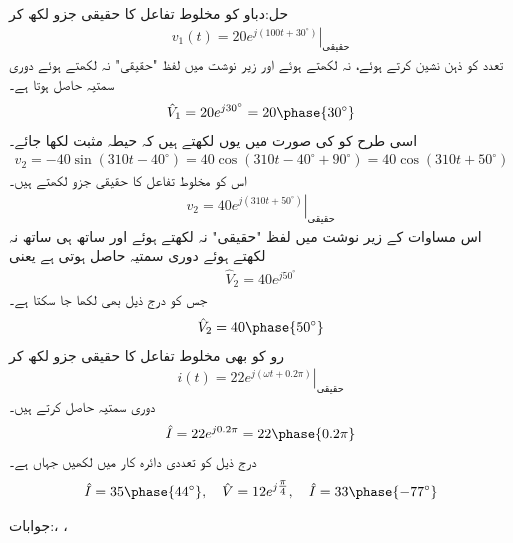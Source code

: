 حل:دباو  کو مخلوط تفاعل کا حقیقی جزو لکھ کر
\begin{align*}
v_1(t)=\left. 20 e^{j(100 t+30^{\circ})}\right|_{\text{حقیقی}}
\end{align*}
تعدد کو ذہن نشین کرتے ہوئے،   نہ لکھتے  ہوئے اور زیر نوشت میں لفظ "حقیقی" نہ لکھتے ہوئے  دوری سمتیہ حاصل ہوتا ہے۔
\begin{align*}
\hat{V}_1=20 e^{j30^{\circ}}=20\phase{30^{\circ}}
\end{align*}
اسی طرح  کو  کی صورت میں یوں لکھتے ہیں کہ حیطہ مثبت لکھا جائے۔
\begin{align*}
v_2=-40 \sin(310t-40^{\circ})=40 \cos (310 t-40^{\circ}+90^{\circ})=40 \cos (310t+50^{\circ})
\end{align*} 
اس کو مخلوط تفاعل کا حقیقی جزو لکھتے ہیں۔
\begin{align*}
v_2=\left.40 e^{j(310t+50^{\circ})}\right|_{\text{حقیقی}}
\end{align*} 
اس مساوات کے زیر نوشت میں لفظ "حقیقی" نہ لکھتے ہوئے اور ساتھ ہی ساتھ  نہ لکھتے ہوئے دوری سمتیہ حاصل ہوتی ہے یعنی
\begin{align*}
\hat{V}_2=40 e^{ j50^{\circ}}
\end{align*} 
جس کو درج ذیل بھی لکھا جا سکتا ہے۔
\begin{align*}
\hat{V}_2=40 \phase{50^{\circ}}
\end{align*} 
رو کو بھی مخلوط تفاعل کا حقیقی جزو لکھ کر
\begin{align*}
i(t)=\left. 22 e^{j(\omega t+0.2\pi)} \right|_{\text{حقیقی}}
\end{align*}
دوری سمتیہ حاصل کرتے ہیں۔
\begin{align*}
\hat{I}=22 e^{j 0.2\pi}=22\phase{0.2 \pi}
\end{align*}
درج ذیل کو تعددی دائرہ کار میں لکھیں جہاں  ہے۔
\begin{align*}
\hat{I}=35\phase{44^{\circ}}, \quad \hat{V}=12 e^{j\tfrac{\pi}{4}}, \quad \hat{I}=33\phase{-77^{\circ}}
\end{align*}

جوابات:، ،\\

